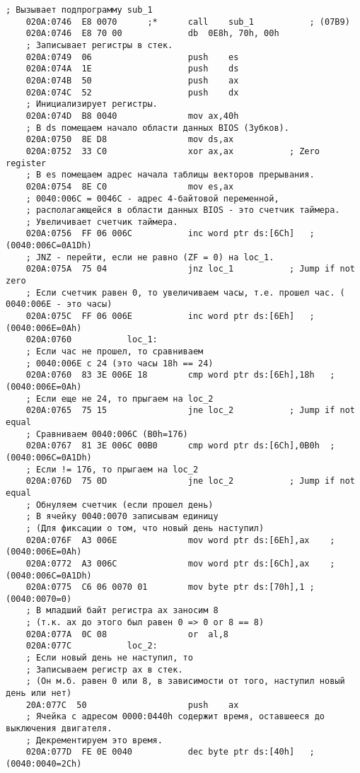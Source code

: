 \documentclass[12pt,a4paper]{report}
\begin{document}


\begin{lstlisting}[label=some-code,caption=Код прерывания INT 8h]
    ; Вызывает подпрограмму sub_1
    020A:0746  E8 0070		;*		call	sub_1			; (07B9)
    020A:0746  E8 70 00				db	0E8h, 70h, 00h
    ; Записывает регистры в стек.
    020A:0749  06					push	es
    020A:074A  1E					push	ds
    020A:074B  50					push	ax
    020A:074C  52					push	dx
    ; Инициализирует регистры.
    020A:074D  B8 0040				mov	ax,40h
    ; В ds помещаем начало области данных BIOS (Зубков).
    020A:0750  8E D8				mov	ds,ax
    020A:0752  33 C0				xor	ax,ax			; Zero register
    ; В es помещаем адрес начала таблицы векторов прерывания.
    020A:0754  8E C0				mov	es,ax
    ; 0040:006C = 0046С - адрес 4-байтовой переменной,
    ; располагающейся в области данных BIOS - это счетчик таймера.
    ; Увеличивает счетчик таймера.
    020A:0756  FF 06 006C			inc	word ptr ds:[6Ch]	; (0040:006C=0A1Dh)
    ; JNZ - перейти, если не равно (ZF = 0) на loc_1. 
    020A:075A  75 04				jnz	loc_1			; Jump if not zero
    ; Если счетчик равен 0, то увеличиваем часы, т.е. прошел час. ( 0040:006E - это часы)
    020A:075C  FF 06 006E			inc	word ptr ds:[6Eh]	; (0040:006E=0Ah)
    020A:0760			loc_1:
    ; Если час не прошел, то сравниваем
    ; 0040:006E с 24 (это часы 18h == 24)
    020A:0760  83 3E 006E 18		cmp	word ptr ds:[6Eh],18h	; (0040:006E=0Ah)
    ; Если еще не 24, то прыгаем на loc_2 
    020A:0765  75 15				jne	loc_2			; Jump if not equal
    ; Сравниваем 0040:006C (B0h=176) 
    020A:0767  81 3E 006C 00B0		cmp	word ptr ds:[6Ch],0B0h	; (0040:006C=0A1Dh)
    ; Если != 176, то прыгаем на loc_2
    020A:076D  75 0D				jne	loc_2			; Jump if not equal
    ; Обнуляем счетчик (если прошел день)
    ; В ячейку 0040:0070 записывам единицу
    ; (Для фиксации о том, что новый день наступил)
    020A:076F  A3 006E				mov	word ptr ds:[6Eh],ax	; (0040:006E=0Ah)
    020A:0772  A3 006C				mov	word ptr ds:[6Ch],ax	; (0040:006C=0A1Dh)
    020A:0775  C6 06 0070 01		mov	byte ptr ds:[70h],1	; (0040:0070=0)
    ; В младший байт регистра ax заносим 8 
    ; (т.к. ax до этого был равен 0 => 0 or 8 == 8)
    020A:077A  0C 08				or	al,8
    020A:077C			loc_2:
    ; Если новый день не наступил, то
    ; Записываем регистр ax в стек.
    ; (Он м.б. равен 0 или 8, в зависимости от того, наступил новый день или нет)
    20A:077C  50					push	ax
    ; Ячейка с адресом 0000:0440h содержит время, оставшееся до выключения двигателя.
    ; Декрементируем это время. 
    020A:077D  FE 0E 0040			dec	byte ptr ds:[40h]	; (0040:0040=2Ch)

\end{lstlisting}
\end{document}
